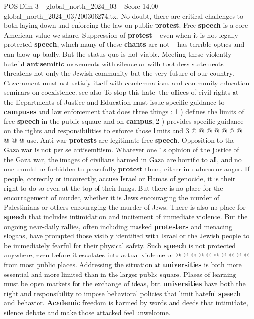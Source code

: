 \begin{textsample}{POS Dim 3 – global\_north\_2024\_03 – Score 14.00 – global\_north\_2024\_03/200306274.txt}
No doubt, there are critical challenges to both laying down and enforcing the law on public \textbf{protest}.
Free \textbf{speech} is a core American value we share.
Suppression of \textbf{protest} -- even when it is not legally protected \textbf{speech}, which many of these \textbf{chants} are not -- has terrible optics and can blow up badly.
But the status quo is not viable.
Meeting these violently hateful \textbf{antisemitic} movements with silence or with toothless statements threatens not only the Jewish community but the very future of our country.
Government must not satisfy itself with condemnations and community education seminars on coexistence. see also To stop this hate, the offices of civil rights at the Departments of Justice and Education must issue specific guidance to \textbf{campuses} and law enforcement that does three things : 1 ) defines the limits of free \textbf{speech} in the public square and on \textbf{campus}, 2 ) provides specific guidance on the rights and responsibilities to enforce those limits and 3 @ @ @ @ @ @ @ @ @ @ use.
Anti-war \textbf{protests} are legitimate free \textbf{speech}.
Opposition to the Gaza war is not per se antisemitism.
Whatever one ' s opinion of the justice of the Gaza war, the images of civilians harmed in Gaza are horrific to all, and no one should be forbidden to peacefully \textbf{protest} them, either in sadness or anger.
If people, correctly or incorrectly, accuse Israel or Hamas of genocide, it is their right to do so even at the top of their lungs.
But there is no place for the encouragement of murder, whether it is Jews encouraging the murder of Palestinians or others encouraging the murder of Jews.
There is also no place for \textbf{speech} that includes intimidation and incitement of immediate violence.
But the ongoing near-daily rallies, often including masked \textbf{protesters} and menacing slogans, have prompted those visibly identified with Israel or the Jewish people to be immediately fearful for their physical safety.
Such \textbf{speech} is not protected anywhere, even before it escalates into actual violence or @ @ @ @ @ @ @ @ @ @ from most public places.
Addressing the situation at \textbf{universities} is both more essential and more limited than in the larger public square.
Places of learning must be open markets for the exchange of ideas, but \textbf{universities} have both the right and responsibility to impose behavioral policies that limit hateful \textbf{speech} and behavior. \textbf{Academic} freedom is harmed by words and deeds that intimidate, silence debate and make those attacked feel unwelcome.

\end{textsample}
